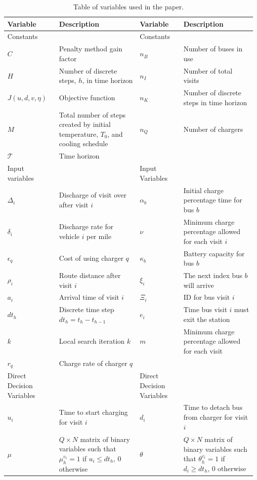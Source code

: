 \documentclass[11pt,a4paper,final]{article}
\newcommand{\T}{\mathcal{T}}                %
\newcommand{\Tau}{T}                        %
\begin{document}
\begin{table}[htbp]
\caption{\label{tab:variables}Table of variables used in the paper.}
\centering
\begin{tabularx}{\textwidth}{L{0.3} L{1.2} L{0.3} L{1.2}}
\textbf{Variable} & \textbf{Description} & \textbf{Variable} & \textbf{Description}\\[0pt]
\hline
Constants &  & Constants & \\[0pt]
\(C\) & Penalty method gain factor & \(n_B\) & Number of buses in use\\[0pt]
\(H\) & Number of discrete steps, \(h\), in time horizon & \(n_I\) & Number of total visits\\[0pt]
\(J(u,d,v,\eta)\) & Objective function & \(n_K\) & Number of discrete steps in time horizon\\[0pt]
\(M\) & Total number of steps created by initial temperature, \(\Tau_0\), and cooling schedule & \(n_Q\) & Number of chargers\\[0pt]
\(\T\) & Time horizon &  & \\[0pt]
\hline
Input variables &  & Input Variables & \\[0pt]
\(\Delta_i\) & Discharge of visit over after visit \(i\) & \(\alpha_b\) & Initial charge percentage time for bus \(b\)\\[0pt]
\(\delta_i\) & Discharge rate for vehicle \(i\) per mile & \(\nu\) & Minimum charge percentage allowed for each visit \(i\)\\[0pt]
\(\epsilon_q\) & Cost of using charger \(q\) & \(\kappa_b\) & Battery capacity for bus \(b\)\\[0pt]
\(\rho_i\) & Route distance after visit \(i\) & \(\xi_i\) & The next index bus \(b\) will arrive\\[0pt]
\(a_i\) & Arrival time of visit \(i\) & \(\Xi_i\) & ID for bus visit \(i\)\\[0pt]
\(dt_h\) & Discrete time step \(dt_h = t_h - t_{h-1}\) & \(e_i\) & Time bus visit \(i\) must exit the station\\[0pt]
\(k\) & Local search iteration \(k\) & \(m\) & Minimum charge percentage allowed for each visit\\[0pt]
\(r_q\) & Charge rate of charger \(q\) &  & \\[0pt]
\hline
Direct Decision Variables &  & Direct Decision Variables & \\[0pt]
\(u_i\) & Time to start charging for visit \(i\) & \(d_i\) & Time to detach bus from charger for visit \(i\)\\[0pt]
\(\mu\) & \(Q \times N\) matrix of binary variables such that \(\mu_h^{v_i} = 1\) if \(u_i \le dt_h\), 0 otherwise & \(\theta\) & \(Q \times N\) matrix of binary variables such that \(\theta_h^{v_i} = 1\) if \(d_i \ge dt_h\), 0 otherwise\\[0pt]

\end{tabularx}
\end{table}
\end{document}
